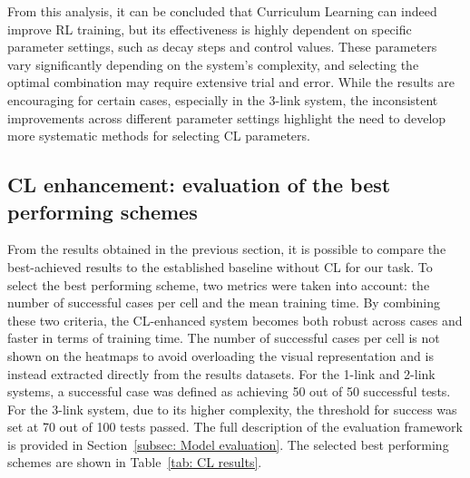 From this analysis, it can be concluded that Curriculum Learning can indeed improve RL training, but its effectiveness is highly dependent on specific parameter settings, such as decay steps and control values. These parameters vary significantly depending on the system's complexity, and selecting the optimal combination may require extensive trial and error. While the results are encouraging for certain cases, especially in the 3-link system, the inconsistent improvements across different parameter settings highlight the need to develop more systematic methods for selecting CL parameters.

\subsection{CL enhancement: evaluation of the best performing schemes}

From the results obtained in the previous section, it is possible to compare the best-achieved results to the established baseline without CL for our task. To select the best performing scheme, two metrics were taken into account: the number of successful cases per cell and the mean training time. By combining these two criteria, the CL-enhanced system becomes both robust across cases and faster in terms of training time. The number of successful cases per cell is not shown on the heatmaps to avoid overloading the visual representation and is instead extracted directly from the results datasets. For the 1-link and 2-link systems, a successful case was defined as achieving 50 out of 50 successful tests. For the 3-link system, due to its higher complexity, the threshold for success was set at 70 out of 100 tests passed. The full description of the evaluation framework is provided in Section~\ref{subsec: Model evaluation}. The selected best performing schemes are shown in Table~\ref{tab: CL results}.

